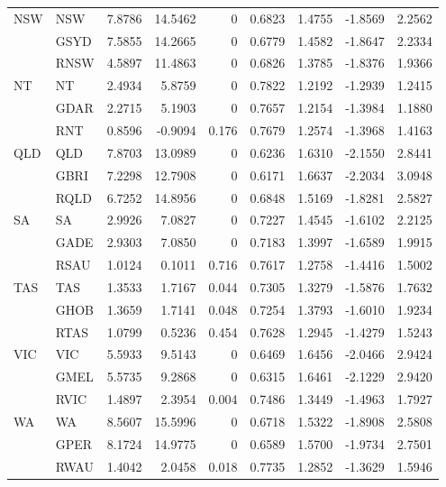 \begin{table}[htbp]
{\begin{tabular}{llrrrrrrr}
    \multirow{3}[0]{*}{NSW} & NSW   & 7.8786 & 14.5462 & 0     & 0.6823 & 1.4755 & -1.8569 & 2.2562 \\
          & GSYD  & 7.5855 & 14.2665 & 0     & 0.6779 & 1.4582 & -1.8647 & 2.2334 \\
          & RNSW  & 4.5897 & 11.4863 & 0     & 0.6826 & 1.3785 & -1.8376 & 1.9366 \\
    \multirow{3}[0]{*}{NT} & NT    & 2.4934 & 5.8759 & 0     & 0.7822 & 1.2192 & -1.2939 & 1.2415 \\
          & GDAR  & 2.2715 & 5.1903 & 0     & 0.7657 & 1.2154 & -1.3984 & 1.1880 \\
          & RNT   & 0.8596 & -0.9094 & 0.176 & 0.7679 & 1.2574 & -1.3968 & 1.4163 \\
    \multirow{3}[0]{*}{QLD} & QLD   & 7.8703 & 13.0989 & 0     & 0.6236 & 1.6310 & -2.1550 & 2.8441 \\
          & GBRI  & 7.2298 & 12.7908 & 0     & 0.6171 & 1.6637 & -2.2034 & 3.0948 \\
          & RQLD  & 6.7252 & 14.8956 & 0     & 0.6848 & 1.5169 & -1.8281 & 2.5827 \\
    \multirow{3}[0]{*}{SA} & SA    & 2.9926 & 7.0827 & 0     & 0.7227 & 1.4545 & -1.6102 & 2.2125 \\
          & GADE  & 2.9303 & 7.0850 & 0     & 0.7183 & 1.3997 & -1.6589 & 1.9915 \\
          & RSAU  & 1.0124 & 0.1011 & 0.716 & 0.7617 & 1.2758 & -1.4416 & 1.5002 \\
    \multirow{3}[0]{*}{TAS} & TAS   & 1.3533 & 1.7167 & 0.044 & 0.7305 & 1.3279 & -1.5876 & 1.7632 \\
          & GHOB  & 1.3659 & 1.7141 & 0.048 & 0.7254 & 1.3793 & -1.6010 & 1.9234 \\
          & RTAS  & 1.0799 & 0.5236 & 0.454 & 0.7628 & 1.2945 & -1.4279 & 1.5243 \\
    \multirow{3}[0]{*}{VIC} & VIC   & 5.5933 & 9.5143 & 0     & 0.6469 & 1.6456 & -2.0466 & 2.9424 \\
          & GMEL  & 5.5735 & 9.2868 & 0     & 0.6315 & 1.6461 & -2.1229 & 2.9420 \\
          & RVIC  & 1.4897 & 2.3954 & 0.004 & 0.7486 & 1.3449 & -1.4963 & 1.7927 \\
    \multirow{3}[1]{*}{WA} & WA    & 8.5607 & 15.5996 & 0     & 0.6718 & 1.5322 & -1.8908 & 2.5808 \\
          & GPER  & 8.1724 & 14.9775 & 0     & 0.6589 & 1.5700 & -1.9734 & 2.7501 \\
          & RWAU  & 1.4042 & 2.0458 & 0.018 & 0.7735 & 1.2852 & -1.3629 & 1.5946 \\
   

    
  
    \bottomrule
    \end{tabular}%
  
  }
\end{table}%
